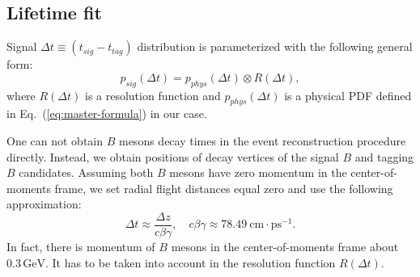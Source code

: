\documentclass[preprint,aps,showpacs]{revtex4}
\newcommand{\dt}{\ensuremath{\Delta t}\xspace}
\newcommand{\bdpi}{\ensuremath{B^0\to \bar D^0\pi^0}\xspace}
\newcommand{\bdetagg}{\ensuremath{B^0\to \bar D^0\eta_{\gamma\gamma}}\xspace}
\newcommand{\bdetap}{\ensuremath{B^0\to \bar D^0\eta\prime}\xspace}
\newcommand{\bdetappp}{\ensuremath{B^0\to \bar D^0\eta_{\pi^+\pi^-\pi^0}}\xspace}
\newcommand{\bdomega}{\ensuremath{B^0\to \bar D^0\omega}\xspace}
\newcommand{\btodstpi}{\ensuremath{B^0\to \bar D^{*0}\pi^0}\xspace}
\newcommand{\btodsteta}{\ensuremath{B^0\to \bar D^{*0}\eta}\xspace}
\newcommand{\mbc}{\ensuremath{M_{bc}}\xspace}
\begin{document}
% 

\clearpage
\subsection{Lifetime fit}\label{sec:mc_lifetime_fit}
Signal $\dt \equiv (t_{sig} - t_{tag})$ distribution is parameterized with the following general form:
\begin{equation}
 p_{sig}(\dt) = p_{phys}(\dt)\otimes R(\dt),
\end{equation}
where $R(\dt)$ is a resolution function and $p_{phys}(\dt)$ is a physical PDF defined in Eq.~(\ref{eq:master-formula}) in our case.

One can not obtain $B$ mesons decay times in the event reconstruction procedure directly. Instead, we obtain positions of decay vertices of the signal $B$ and tagging $B$ candidates. Assuming both $B$ mesons have zero momentum in the center-of-moments frame, we set radial flight distances equal zero and use the following approximation:
\begin{equation}\label{eq:dz-dt}
 \dt \approx \frac{\Delta z}{c\beta\gamma},\quad c\beta\gamma\approx 78.49~\text{cm}\cdot\text{ps}^{-1}.
\end{equation}
In fact, there is momentum of $B$ mesons in the center-of-moments frame about $0.3\,\text{GeV}$. It has to be taken into account in the resolution function $R(\Delta t)$.
\end{document}
